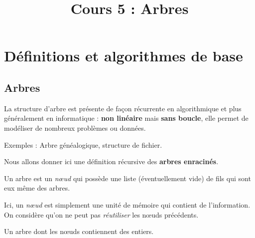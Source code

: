 \documentclass{../cours}
\title{Cours 5 : Arbres}
\begin{document}
\maketitle
 
\section{Définitions et algorithmes de base}

\subsection{Arbres}

La structure d'arbre est présente de façon récurrente en algorithmique et plus généralement en informatique : \textbf{non linéaire} mais \textbf{sans boucle}, elle permet de modéliser de nombreux problèmes ou données. 

Exemples : Arbre généalogique, structure de fichier.

Nous allons donner ici une définition récursive des \textbf{arbres enracinés}.

\begin{Definition}
Un arbre est un \emph{n\oe{}ud} qui possède une liste (éventuellement vide) de fils qui sont eux même des arbres. 
\end{Definition}

Ici, un \emph{n\oe{}ud} est simplement une unité de mémoire qui contient de l'information. On considère qu'on ne peut pas \emph{réutiliser} les  n\oe{}uds précédents.

\begin{Example}
\label{ex:arbre}
Un arbre dont les nœuds contiennent des entiers.
{ \newcommand{\nodea}{\node[draw,circle] (a) {$3$}
;}\newcommand{\nodeb}{\node[draw,circle] (b) {$5$}
;}\newcommand{\nodec}{\node[draw,circle] (c) {$2$}
;}\newcommand{\noded}{\node[draw,circle] (d) {$3$}
;}\newcommand{\nodee}{\node[draw,circle] (e) {$4$}
;}\newcommand{\nodef}{\node[draw,circle] (f) {$2$}
;}\newcommand{\nodeg}{\node[draw,circle] (g) {$7$}
;}\newcommand{\nodeh}{\node[draw,circle] (h) {$1$}
;}\newcommand{\nodei}{\node[draw,circle] (i) {$9$}
;}}
\end{Example}
\end{document}

